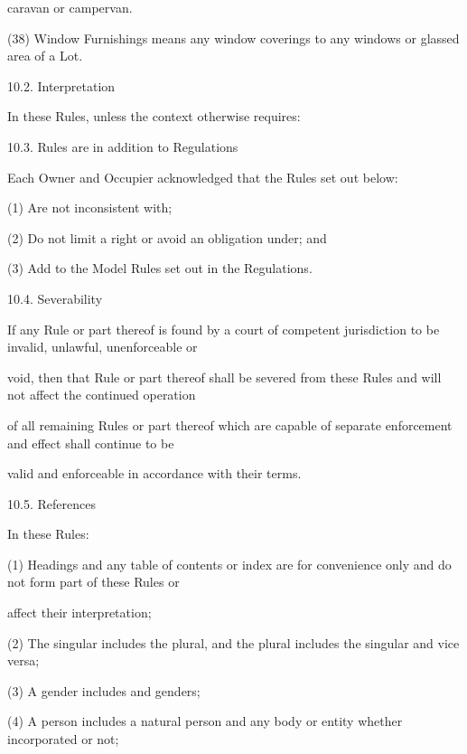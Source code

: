 \documentclass{article}
\begin{document}
{\fontsize{10.02}{1}caravan or campervan. }

{\fontsize{9.962}{1}(38) Window Furnishings means any window coverings to any windows or glassed area of a Lot. }

{\fontsize{9.99}{1}10.2. Interpretation }

{\fontsize{10.02}{1}In these Rules, unless the context otherwise requires: }

{\fontsize{9.99}{1}10.3. Rules are in addition to Regulations }

{\fontsize{10.02}{1}Each Owner and Occupier acknowledged that the Rules set out below: }

\newpage

{\fontsize{9.962}{1}(1) Are not inconsistent with; }

{\fontsize{9.962}{1}(2) Do not limit a right or avoid an obligation under; and }

{\fontsize{9.962}{1}(3) Add to the Model Rules set out in the Regulations. }

{\fontsize{9.99}{1}10.4. Severability }

{\fontsize{10.02}{1}If any Rule or part thereof is found by a court of competent jurisdiction to be invalid, unlawful, unenforceable or }

{\fontsize{10.02}{1}void, then that Rule or part thereof shall be severed from these Rules and will not affect the continued operation }

{\fontsize{10.02}{1}of all remaining Rules or part thereof which are capable of separate enforcement and effect shall continue to be }

{\fontsize{10.02}{1}valid and enforceable in accordance with their terms. }

{\fontsize{9.99}{1}10.5. References }

{\fontsize{10.02}{1}In these Rules: }

{\fontsize{9.962}{1}(1) Headings and any table of contents or index are for convenience only and do not form part of these Rules or }

{\fontsize{10.02}{1}affect their interpretation; }

{\fontsize{9.962}{1}(2) The singular includes the plural, and the plural includes the singular and vice versa; }

{\fontsize{9.962}{1}(3) A gender includes and genders; }

{\fontsize{9.962}{1}(4) A person includes a natural person and any body or entity whether incorporated or not; }
\end{document}

